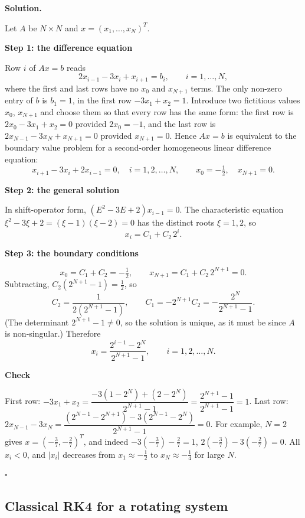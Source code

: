 \documentclass[11pt,a4paper]{article}
\newenvironment{solution}
  {\par\noindent\textbf{Solution.}\par\nobreak}
  {\par\hfill\(\square\)\par}
\newcommand{\step}[1]{\par\addvspace{0.5em}\noindent\textbf{#1}\par\nobreak}
\begin{document}
\begin{solution}
Let \(A\) be \(N\times N\) and \(x=(x_1,\dots,x_N)^T\).

\step{Step 1: the difference equation}
Row \(i\) of \(Ax=b\) reads
\[
  2x_{i-1}-3x_i+x_{i+1}=b_i,\qquad i=1,\dots,N,
\]
where the first and last rows have no \(x_0\) and \(x_{N+1}\) terms.
The only non-zero entry of \(b\) is \(b_1=1\), in the first row
\(-3x_1+x_2=1\).  Introduce two fictitious values \(x_0\), \(x_{N+1}\)
and choose them so that every row has the same form: the first row is
\(2x_0-3x_1+x_2=0\) provided \(2x_0=-1\), and the last row is
\(2x_{N-1}-3x_N+x_{N+1}=0\) provided \(x_{N+1}=0\).  Hence \(Ax=b\) is
equivalent to the boundary value problem for a second-order
homogeneous linear difference equation:
\[
  \boxed{\;x_{i+1}-3x_i+2x_{i-1}=0,\quad i=1,2,\dots,N,
  \qquad x_0=-\tfrac12,\quad x_{N+1}=0.\;}
\]

\step{Step 2: the general solution}
In shift-operator form, \((E^2-3E+2)x_{i-1}=0\).  The characteristic
equation \(\xi^2-3\xi+2=(\xi-1)(\xi-2)=0\) has the distinct roots
\(\xi=1,2\), so
\[
  x_i=C_1+C_2\,2^i .
\]

\step{Step 3: the boundary conditions}
\[
  x_0=C_1+C_2=-\tfrac12,\qquad x_{N+1}=C_1+C_2\,2^{N+1}=0 .
\]
Subtracting, \(C_2(2^{N+1}-1)=\frac12\), so
\[
  C_2=\frac1{2(2^{N+1}-1)},\qquad
  C_1=-2^{N+1}C_2=-\frac{2^N}{2^{N+1}-1}.
\]
(The determinant \(2^{N+1}-1\ne0\), so the solution is unique, as it
must be since \(A\) is non-singular.)  Therefore
\[
  \boxed{\;x_i=\frac{2^{i-1}-2^N}{2^{N+1}-1},\qquad i=1,2,\dots,N.\;}
\]

\step{Check}
First row:
\(-3x_1+x_2=\dfrac{-3(1-2^N)+(2-2^N)}{2^{N+1}-1}=\dfrac{2^{N+1}-1}{2^{N+1}-1}=1\).
Last row:
\(2x_{N-1}-3x_N=\dfrac{(2^{N-1}-2^{N+1})-3(2^{N-1}-2^N)}{2^{N+1}-1}=0\).
For example, \(N=2\) gives \(x=(-\frac37,-\frac27)^T\), and indeed
\(-3(-\frac37)-\frac27=1\), \(2(-\frac37)-3(-\frac27)=0\).  All
\(x_i<0\), and \(|x_i|\) decreases from \(x_1\approx-\frac12\) to
\(x_N\approx-\frac14\) for large \(N\).
\end{solution}

\subsection{Classical RK4 for a rotating system}
\end{document}
